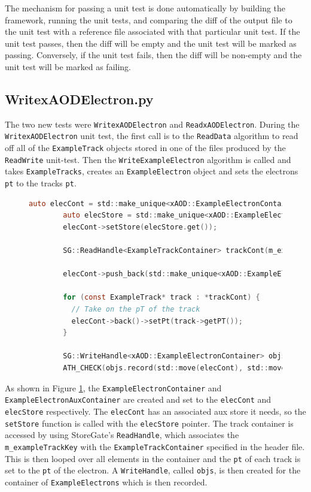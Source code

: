 The mechanism for passing a unit test is done automatically by building the framework, running the unit tests, and comparing the diff of the output file to the unit test with a reference file associated with that particular unit test. 
If the unit test passes, then the diff will be empty and the unit test will be marked as passing.
Conversely, if the unit test fails, then the diff will be non-empty and the unit test will be marked as failing.

\subsection{WritexAODElectron.py}
The two new tests were \verb|WritexAODElectron| and \verb|ReadxAODElectron|.
During the \verb|WritexAODElectron| unit test, the first call is to the \verb|ReadData| algorithm to read off all of the \verb|ExampleTrack| objects stored in one of the files produced by the \verb|ReadWrite| unit-test.
Then the \verb|WriteExampleElectron| algorithm is called and takes \verb|ExampleTracks|, creates an \verb|ExampleElectron| object and sets the electrons \verb|pt| to the tracks \verb|pt|. 

\begin{figure}[h]
    \centering
    \begin{lstlisting}[language=C]
        auto elecCont = std::make_unique<xAOD::ExampleElectronContainer>();
        auto elecStore = std::make_unique<xAOD::ExampleElectronAuxContainer>();
        elecCont->setStore(elecStore.get());

        SG::ReadHandle<ExampleTrackContainer> trackCont(m_exampleTrackKey, ctx);
    
        elecCont->push_back(std::make_unique<xAOD::ExampleElectron>());
      
        for (const ExampleTrack* track : *trackCont) {
          // Take on the pT of the track
          elecCont->back()->setPt(track->getPT());
        }

        SG::WriteHandle<xAOD::ExampleElectronContainer> objs(m_exampleElectronContainerKey, ctx);
        ATH_CHECK(objs.record(std::move(elecCont), std::move(elecStore)));
    \end{lstlisting}
    \label{fig:Mod_utests_WritexAODElectron1}
\end{figure}
As shown in Figure \ref{fig:Mod_utests_WritexAODElectron1}, the \verb|ExampleElectronContainer| and \verb|ExampleElectronAuxContainer| are created and set to the \verb|elecCont| and \verb|elecStore| respectively.
The \verb|elecCont| has an associated aux store it needs, so the \verb|setStore| function is called with the \verb|elecStore| pointer.
The track container is accessed by using StoreGate's \verb|ReadHandle|, which associates the \verb|m_exampleTrackKey| with the \verb|ExampleTrackContainer| specified in the header file.
This is then looped over all elements in the container and the \verb|pt| of each track is set to the \verb|pt| of the electron.
A \verb|WriteHandle|, called \verb|objs|, is then created for the container of \verb|ExampleElectrons| which is then recorded.


